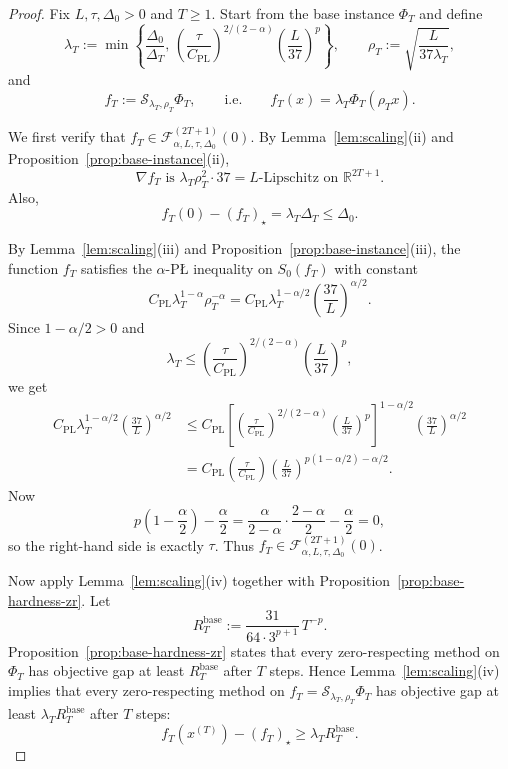 \documentclass[11pt]{article}
\newcommand{\R}{\mathbb{R}}
\begin{document}
\begin{proof}
Fix $L,\tau,\Delta_0>0$ and $T\ge 1$.
Start from the base instance $\Phi_T$ and define
\[
\lambda_T
:=
\min\!\left\{
\frac{\Delta_0}{\Delta_T},\,
\left(\frac{\tau}{C_{\mathrm{PL}}}\right)^{2/(2-\alpha)}
\left(\frac{L}{37}\right)^p
\right\},
\qquad
\rho_T:=\sqrt{\frac{L}{37\lambda_T}},
\]
and
\[
f_T:=\mathcal S_{\lambda_T,\rho_T}\Phi_T,
\qquad
\text{i.e.}\qquad
f_T(x)=\lambda_T\Phi_T(\rho_T x).
\]

We first verify that $f_T\in \mathcal F^{(2T+1)}_{\alpha,L,\tau,\Delta_0}(0)$.
By Lemma~\ref{lem:scaling}(ii) and Proposition~\ref{prop:base-instance}(ii),
\[
\nabla f_T
\text{ is }
\lambda_T\rho_T^2\cdot 37
=
L
\text{-Lipschitz on }\R^{2T+1}.
\]
Also,
\[
f_T(0)-(f_T)_\star=\lambda_T\Delta_T\le \Delta_0.
\]

By Lemma~\ref{lem:scaling}(iii) and Proposition~\ref{prop:base-instance}(iii), the function $f_T$ satisfies the $\alpha$-P\L{} inequality on $S_0(f_T)$ with constant
\[
C_{\mathrm{PL}}\lambda_T^{1-\alpha}\rho_T^{-\alpha}
=
C_{\mathrm{PL}}\lambda_T^{1-\alpha/2}\left(\frac{37}{L}\right)^{\alpha/2}.
\]
Since $1-\alpha/2>0$ and
\[
\lambda_T
\le
\left(\frac{\tau}{C_{\mathrm{PL}}}\right)^{2/(2-\alpha)}
\left(\frac{L}{37}\right)^p,
\]
we get
\[
\begin{aligned}
C_{\mathrm{PL}}\lambda_T^{1-\alpha/2}\left(\frac{37}{L}\right)^{\alpha/2}
&\le
C_{\mathrm{PL}}
\left[
\left(\frac{\tau}{C_{\mathrm{PL}}}\right)^{2/(2-\alpha)}
\left(\frac{L}{37}\right)^p
\right]^{1-\alpha/2}
\left(\frac{37}{L}\right)^{\alpha/2}\\
&=
C_{\mathrm{PL}}
\left(\frac{\tau}{C_{\mathrm{PL}}}\right)
\left(\frac{L}{37}\right)^{p(1-\alpha/2)-\alpha/2}.
\end{aligned}
\]
Now
\[
p\left(1-\frac{\alpha}{2}\right)-\frac{\alpha}{2}
=
\frac{\alpha}{2-\alpha}\cdot \frac{2-\alpha}{2}-\frac{\alpha}{2}
=
0,
\]
so the right-hand side is exactly $\tau$.
Thus $f_T\in \mathcal F^{(2T+1)}_{\alpha,L,\tau,\Delta_0}(0)$.

Now apply Lemma~\ref{lem:scaling}(iv) together with Proposition~\ref{prop:base-hardness-zr}. Let
\[
R_T^{\mathrm{base}}
:=
\frac{31}{64\cdot 3^{p+1}}\,T^{-p}.
\]
Proposition~\ref{prop:base-hardness-zr} states that every zero-respecting method on \(\Phi_T\) has objective gap at
least \(R_T^{\mathrm{base}}\) after \(T\) steps. Hence Lemma~\ref{lem:scaling}(iv) implies that every
zero-respecting method on \(f_T=\mathcal S_{\lambda_T,\rho_T}\Phi_T\) has objective gap at least
\(\lambda_T R_T^{\mathrm{base}}\) after \(T\) steps:
\[
f_T(x^{(T)})-(f_T)_\star
\ge
\lambda_T R_T^{\mathrm{base}}.
\]


\end{proof}
\end{document}
